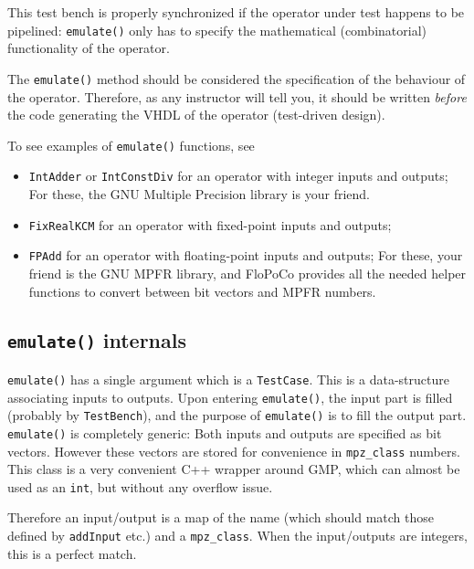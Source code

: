 \documentclass{article}
\begin{document}
This test bench is properly synchronized if the operator under test happens to be pipelined: \texttt{\small emulate()} only has to specify the mathematical (combinatorial) functionality of the operator.

The \texttt{\small emulate()} method should be considered  the specification of the behaviour of the operator.
Therefore, as any instructor will tell you, it should be written \emph{before} the code generating the VHDL of the operator (test-driven design).


To see examples of \texttt{emulate()} functions, see
\begin{itemize}
\item \texttt{IntAdder} or \texttt{IntConstDiv} for an operator with integer inputs and outputs;
  For these, the GNU Multiple Precision library is your friend.
\item \texttt{FixRealKCM} for an operator with fixed-point inputs and outputs;
\item \texttt{FPAdd}  for an operator with floating-point inputs and outputs;
  For these, your friend is the GNU MPFR library, and FloPoCo provides all the needed helper functions to convert between bit vectors and MPFR numbers.
\end{itemize}


\subsection{\texttt{emulate()}  internals}
\texttt{\small emulate()} has a single argument which is a \texttt{\small TestCase}.
This is a data-structure associating inputs to outputs.
Upon entering \texttt{\small emulate()}, the input part is filled (probably by \texttt{\small TestBench}), and the purpose of \texttt{\small emulate()} is to fill the output part.
\texttt{\small emulate()} is completely generic:
Both inputs and outputs are specified as bit vectors.
However these vectors are stored for convenience in \texttt{\small mpz\_class} numbers.
This class is a very convenient C++ wrapper around GMP, which can almost be used as an \texttt{\small int}, but without any overflow issue.

Therefore an input/output is a map of the name (which should match those defined by \texttt{\small addInput} etc.) and a \texttt{\small mpz\_class}.
When the input/outputs are integers, this is a perfect match.
\end{document}
